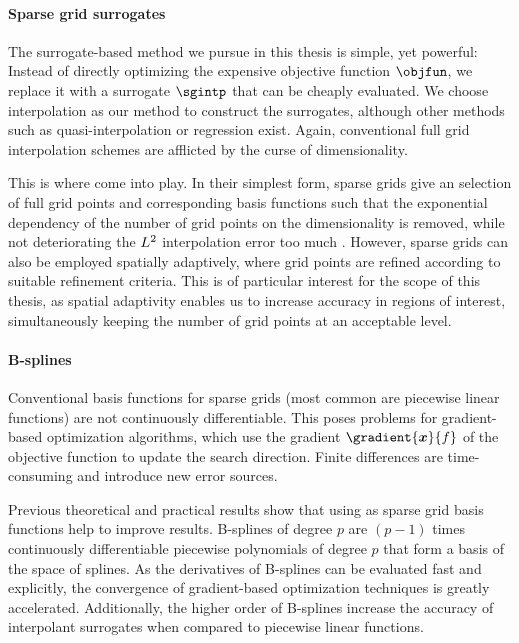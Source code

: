 \paragraph{Sparse grid surrogates}

The surrogate-based method we pursue in this thesis is simple, yet powerful:
Instead of directly optimizing the expensive objective function $\objfun$,
we replace it with a surrogate $\sgintp$ that can be cheaply evaluated.
We choose interpolation as our method to construct the surrogates,
although other methods such as quasi-interpolation
\cite{Hoellig13Approximation} or regression \cite{Pflueger10Spatially} exist.
Again, conventional full grid interpolation schemes are afflicted by the
curse of dimensionality.

This is where  come into play.
In their simplest form, sparse grids give an  selection of
full grid points and corresponding basis functions such that
the exponential dependency of the number of grid points on the dimensionality
is removed, while not deteriorating the $L^2$ interpolation error too much
\cite{Bungartz04Sparse}.
However, sparse grids can also be employed spatially adaptively,
where grid points are refined  according to suitable
refinement criteria.
This is of particular interest for the scope of this thesis,
as spatial adaptivity enables us to increase accuracy in regions of interest,
simultaneously keeping the number of grid points at an acceptable level.

\paragraph{B-splines}

Conventional basis functions for sparse grids
(most common are piecewise linear functions)
are not continuously differentiable.
This poses problems for gradient-based optimization algorithms,
which use the gradient $\gradient{\*x}{f}$ of the objective function
to update the search direction.
Finite differences are time-consuming and introduce new error sources.

Previous theoretical \cite{Sickel11Spline} and practical
 results show that
using  as sparse grid basis functions help to improve results.
B-splines of degree $p$ are $(p-1)$ times continuously differentiable
piecewise polynomials of degree $p$ that form a basis of the space of splines.
As the derivatives of B-splines can be evaluated fast and explicitly,
the convergence of gradient-based optimization techniques is
greatly accelerated.
Additionally, the higher order of B-splines increase the accuracy
of interpolant surrogates when compared to piecewise linear functions.

